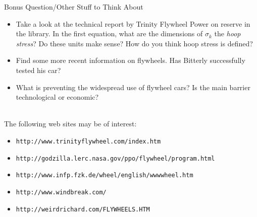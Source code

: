 Bonus Question/Other Stuff to Think About
\begin{itemize}
\item  Take a look at the technical report by Trinity Flywheel Power
on reserve in the library.  In the first equation, what are the
dimensions of $\sigma_k$ the {\em hoop stress}?  Do these units make
sense?  How do you think hoop stress is defined?

\item Find some more recent information on flywheels.  Has Bitterly
successfully tested his car?

\item What is preventing the widespread use of flywheel cars?  Is the
main barrier technological or economic?  

\end{itemize}

\hspace{2mm}\\
The following web sites may be of interest:
\begin{itemize}

\item {\tt http://www.trinityflywheel.com/index.htm  }

\item {\tt http://godzilla.lerc.nasa.gov/ppo/flywheel/program.html }

\item {\tt http://www.infp.fzk.de/wheel/english/wwwwheel.htm}

\item {\tt http://www.windbreak.com/ }

\item {\tt http://weirdrichard.com/FLYWHEELS.HTM}

\end{itemize}







